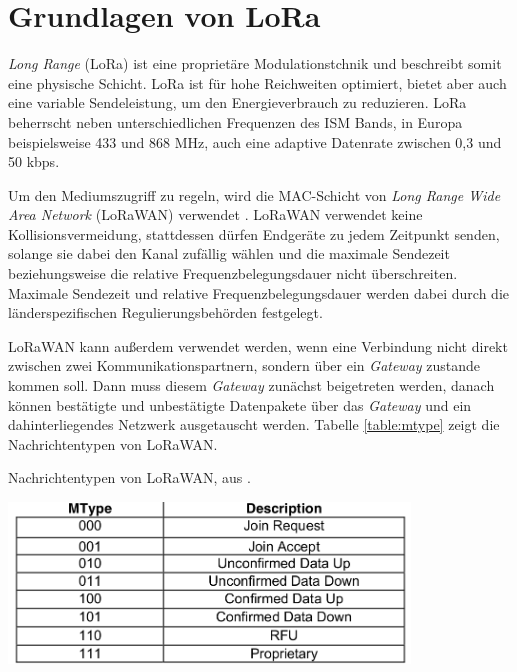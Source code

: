 \section{Grundlagen von LoRa}
\emph{Long Range} (LoRa) ist eine proprietäre Modulationstchnik und beschreibt somit eine physische Schicht.
LoRa ist für hohe Reichweiten optimiert, bietet aber auch eine variable Sendeleistung, um den Energieverbrauch zu reduzieren.
LoRa beherrscht neben unterschiedlichen Frequenzen des ISM Bands, in Europa beispielsweise 433 und 868 MHz, auch eine adaptive Datenrate zwischen 0,3 und 50 kbps.

Um den Mediumszugriff zu regeln, wird die MAC-Schicht von \emph{Long Range Wide Area Network} (LoRaWAN) verwendet \cite{lora2015spec}.
LoRaWAN verwendet keine Kollisionsvermeidung, stattdessen dürfen Endgeräte zu jedem Zeitpunkt senden, solange sie dabei den Kanal zufällig wählen und die maximale Sendezeit beziehungsweise die relative Frequenzbelegungsdauer nicht überschreiten.
Maximale Sendezeit und relative Frequenzbelegungsdauer werden dabei durch die länderspezifischen Regulierungsbehörden festgelegt.

LoRaWAN kann außerdem verwendet werden, wenn eine Verbindung nicht direkt zwischen zwei Kommunikationspartnern, sondern über ein \emph{Gateway} zustande kommen soll.
Dann muss diesem \emph{Gateway} zunächst beigetreten werden, danach können bestätigte und unbestätigte Datenpakete über das \emph{Gateway} und ein dahinterliegendes Netzwerk ausgetauscht werden.
Tabelle \ref{table:mtype} zeigt die Nachrichtentypen von LoRaWAN.

\begin{table}[h]
  \centering
  \caption{Nachrichtentypen von LoRaWAN, aus \cite{lora2015spec}.}
	\includegraphics[width=0.8\textwidth]{images/mtype.png}
  \label{table:mtype}
\end{table}


